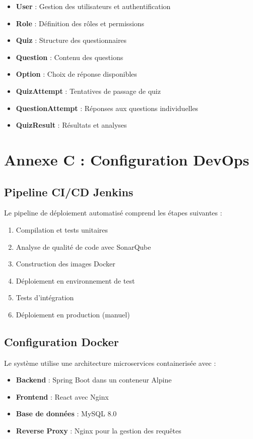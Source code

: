 \documentclass[12pt,a4paper]{report}
\begin{document}
\begin{itemize}
    \item \textbf{User} : Gestion des utilisateurs et authentification
    \item \textbf{Role} : Définition des rôles et permissions
    \item \textbf{Quiz} : Structure des questionnaires
    \item \textbf{Question} : Contenu des questions
    \item \textbf{Option} : Choix de réponse disponibles
    \item \textbf{QuizAttempt} : Tentatives de passage de quiz
    \item \textbf{QuestionAttempt} : Réponses aux questions individuelles
    \item \textbf{QuizResult} : Résultats et analyses
\end{itemize}

\section*{Annexe C : Configuration DevOps}

\subsection*{Pipeline CI/CD Jenkins}

Le pipeline de déploiement automatisé comprend les étapes suivantes :

\begin{enumerate}
    \item Compilation et tests unitaires
    \item Analyse de qualité de code avec SonarQube
    \item Construction des images Docker
    \item Déploiement en environnement de test
    \item Tests d'intégration
    \item Déploiement en production (manuel)
\end{enumerate}

\subsection*{Configuration Docker}

Le système utilise une architecture microservices containerisée avec :

\begin{itemize}
    \item \textbf{Backend} : Spring Boot dans un conteneur Alpine
    \item \textbf{Frontend} : React avec Nginx
    \item \textbf{Base de données} : MySQL 8.0
    \item \textbf{Reverse Proxy} : Nginx pour la gestion des requêtes
\end{itemize}
\end{document}

